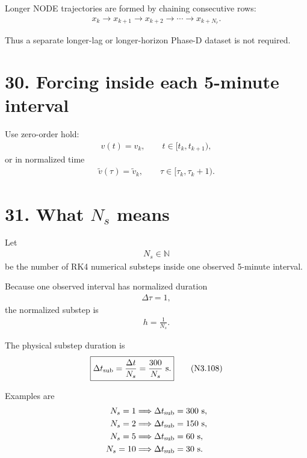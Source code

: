 \documentclass[11pt]{article}
\begin{document}
Longer NODE trajectories are formed by chaining consecutive rows:
\begin{align}
\boxed{
x_k
\rightarrow
x_{k+1}
\rightarrow
x_{k+2}
\rightarrow
\cdots
\rightarrow
x_{k+N_r}.
}
\tag{N3.104}
\end{align}

Thus a separate longer-lag or longer-horizon Phase-D dataset is not required.

\section*{30. Forcing inside each 5-minute interval}

Use zero-order hold:
\begin{align}
\boxed{
v(t)=v_k,
\qquad
t\in[t_k,t_{k+1}),
}
\tag{N3.105}
\end{align}
or in normalized time
\begin{align}
\boxed{
\widetilde v(\tau)=\widetilde v_k,
\qquad
\tau\in[\tau_k,\tau_k+1).
}
\tag{N3.106}
\end{align}

\section*{31. What \(N_s\) means}

Let
\begin{align}
N_s\in\mathbb N
\end{align}
be the number of RK4 numerical substeps inside one observed 5-minute interval.

Because one observed interval has normalized duration
\begin{align}
\Delta\tau=1,
\end{align}
the normalized substep is
\begin{align}
\boxed{h=\frac{1}{N_s}.}
\tag{N3.107}
\end{align}

The physical substep duration is
\begin{align}
\boxed{
\Delta t_{\rm sub}
=
\frac{\Delta t}{N_s}
=
\frac{300}{N_s}\ {\rm s}.
}
\tag{N3.108}
\end{align}

Examples are
\begin{align}
N_s=1
&\Longrightarrow \Delta t_{\rm sub}=300\ {\rm s},\\
N_s=2
&\Longrightarrow \Delta t_{\rm sub}=150\ {\rm s},\\
N_s=5
&\Longrightarrow \Delta t_{\rm sub}=60\ {\rm s},\\
N_s=10
&\Longrightarrow \Delta t_{\rm sub}=30\ {\rm s}.
\end{align}
\end{document}
